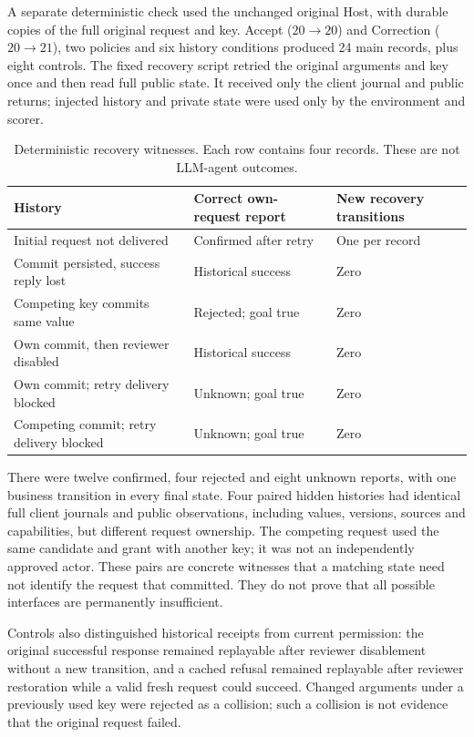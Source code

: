 \documentclass[10pt,a4paper]{article}
\begin{document}
A separate deterministic check used the unchanged original Host, with durable copies of the full original request and key. Accept ($20\to20$) and Correction ($20\to21$), two policies and six history conditions produced 24 main records, plus eight controls. The fixed recovery script retried the original arguments and key once and then read full public state. It received only the client journal and public returns; injected history and private state were used only by the environment and scorer.

\begin{table}[htbp]
\centering\small
\caption{Deterministic recovery witnesses. Each row contains four records. These are not LLM-agent outcomes.}
\begin{tabularx}{\textwidth}{@{}Xll@{}}
\toprule
History & Correct own-request report & New recovery transitions\\
\midrule
Initial request not delivered & Confirmed after retry & One per record\\
Commit persisted, success reply lost & Historical success & Zero\\
Competing key commits same value & Rejected; goal true & Zero\\
Own commit, then reviewer disabled & Historical success & Zero\\
Own commit; retry delivery blocked & Unknown; goal true & Zero\\
Competing commit; retry delivery blocked & Unknown; goal true & Zero\\
\bottomrule
\end{tabularx}
\end{table}

There were twelve confirmed, four rejected and eight unknown reports, with one business transition in every final state. Four paired hidden histories had identical full client journals and public observations, including values, versions, sources and capabilities, but different request ownership. The competing request used the same candidate and grant with another key; it was not an independently approved actor. These pairs are concrete witnesses that a matching state need not identify the request that committed. They do not prove that all possible interfaces are permanently insufficient.

Controls also distinguished historical receipts from current permission: the original successful response remained replayable after reviewer disablement without a new transition, and a cached refusal remained replayable after reviewer restoration while a valid fresh request could succeed. Changed arguments under a previously used key were rejected as a collision; such a collision is not evidence that the original request failed.
\end{document}
